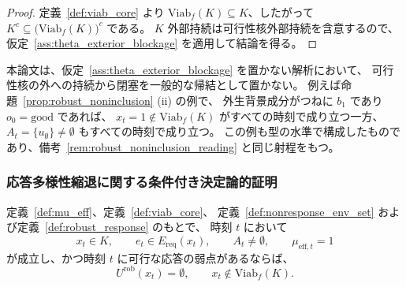 \begin{proof}
定義~\ref{def:viab_core} より
$\mathrm{Viab}_f(K)\subseteq K$、したがって
$K^c\subseteq\bigl(\mathrm{Viab}_f(K)\bigr)^c$ である。
$K$ 外部持続は可行性核外部持続を含意するので、
仮定~\ref{ass:theta_exterior_blockage} を適用して結論を得る。
\end{proof}

\begin{remark}[可行性核の外への持続と閉塞の関係]
\label{rem:exterior_without_blockage}
本論文は、仮定~\ref{ass:theta_exterior_blockage} を置かない解析において、
可行性核の外への持続から閉塞を一般的な帰結として置かない。
例えば命題~\ref{prop:robust_noninclusion} (ii) の例で、
外生背景成分がつねに $b_1$ であり $o_0=\mathrm{good}$ であれば、
$x_t=1\notin\mathrm{Viab}_f(K)$ がすべての時刻で成り立つ一方、
$A_t=\{u_{\emptyset}\}\neq\emptyset$ もすべての時刻で成り立つ。
この例も型の水準で構成したものであり、備考~\ref{rem:robust_noninclusion_reading} と同じ射程をもつ。
\end{remark}

\subsubsection{応答多様性縮退に関する条件付き決定論的証明}

\begin{lemma}[応答多様性縮退と応答の弱点による頑健応答不能]
\label{lem:sd_viab}
定義~\ref{def:mu_eff}、定義~\ref{def:viab_core}、
定義~\ref{def:nonresponse_env_set} および定義~\ref{def:robust_response} のもとで、
時刻 $t$ において
\[
  x_t\in K,
  \qquad
  e_t\in E_{\mathrm{req}}(x_t),
  \qquad
  A_t\neq\emptyset,
  \qquad
  \mu_{\mathrm{eff},t}=1
\]
が成立し、かつ時刻 $t$ に可行な応答の弱点があるならば、
\[
  U^{\mathrm{rob}}(x_t)=\emptyset,
  \qquad
  x_t\notin\mathrm{Viab}_f(K).
\]
\end{lemma}

